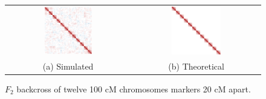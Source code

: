 \documentclass{article}
\begin{document}
\begin{figure}[htp]
  \begin{center}
    \begin{tabular}{cc}
      \includegraphics[width = 0.4\textwidth]{./img/LBSim.png} &
      \includegraphics[width = 0.4\textwidth]{./img/LBSimTheory.png} \\
      {\footnotesize (a) Simulated} &
      {\footnotesize (b) Theoretical} \\
    \end{tabular}
  \end{center}
  \caption{$F_2$ backcross of twelve 100 cM chromosomes markers 20 cM apart.}
  \label{fig:paperTheory}
\end{figure}

\end{document}
